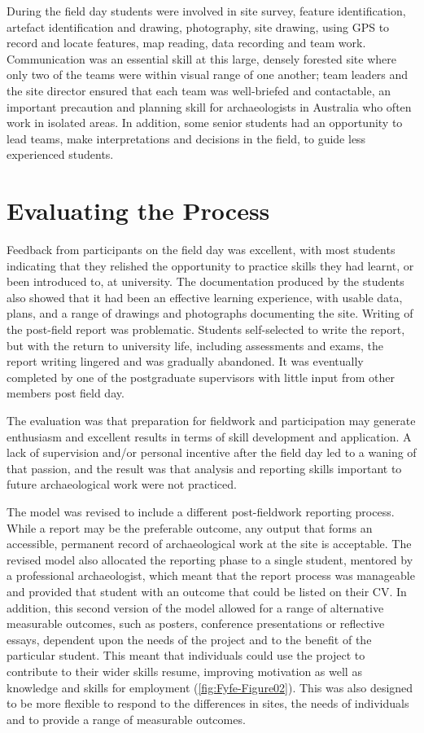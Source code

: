 \documentclass{ijsra}
\begin{document}
During the field day students were involved in site survey, feature identification, artefact identification and drawing, photography, site drawing, using GPS to record and locate features, map reading, data recording and team work. 
Communication was an essential skill at this large, densely forested site where only two of the teams were within visual range of one another; team leaders and the site director ensured that each team was well-briefed and contactable, an important precaution and planning skill for archaeologists in Australia who often work in isolated areas. 
In addition, some senior students had an opportunity to lead teams, make interpretations and decisions in the field, to guide less experienced students.

\section{Evaluating the Process}

Feedback from participants on the field day was excellent, with most students indicating that they relished the opportunity to practice skills they had learnt, or been introduced to, at university. 
The documentation produced by the students also showed that it had been an effective learning experience, with usable data, plans, and a range of drawings and photographs documenting the site. 
Writing of the post-field report was problematic. Students self-selected to write the report, but with the return to university life, including assessments and exams, the report writing lingered and was gradually abandoned. It was eventually completed by one of the postgraduate supervisors with little input from other members post field day.

The evaluation was that preparation for fieldwork and participation may generate enthusiasm and excellent results in terms of skill development and application. 
A lack of supervision and/or personal incentive after the field day led to a waning of that passion, and the result was that analysis and reporting skills important to future archaeological work were not practiced.

The model was revised to include a different post-fieldwork reporting process. While a report may be the preferable outcome, any output that forms an accessible, permanent record of archaeological work at the site is acceptable. 
The revised model also allocated the reporting phase to a single student, mentored by a professional archaeologist, which meant that the report process was manageable and provided that student with an outcome that could be listed on their CV. 
In addition, this second version of the model allowed for a range of alternative measurable outcomes, such as posters, conference presentations or reflective essays, dependent upon the needs of the project and to the benefit of the particular student. 
This meant that individuals could use the project to contribute to their wider skills resume, improving motivation as well as knowledge and skills for employment (\cref{fig:Fyfe-Figure02}). This was also designed to be more flexible to respond to the differences in sites, the needs of individuals and to provide a range of measurable outcomes.
\end{document}
